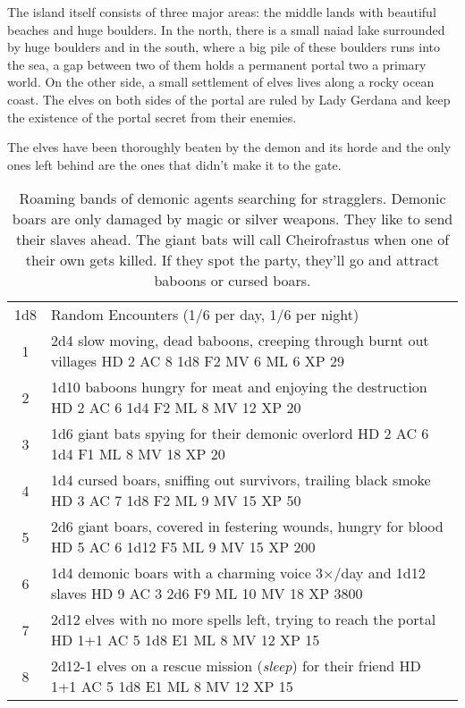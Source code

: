 \documentclass[a4paper,serif]{rpg-module}
\begin{document}
The island itself consists of three major areas: the middle lands with
beautiful beaches and huge boulders. In the north, there is a small
naiad lake surrounded by huge boulders and in the south, where a big
pile of these boulders runs into the sea, a gap between two of them
holds a permanent portal two a primary world. On the other side, a
small settlement of elves lives along a rocky ocean coast. The elves
on both sides of the portal are ruled by Lady Gerdana
and keep the existence of the portal secret from their enemies.

The elves have been thoroughly beaten by the demon and its horde and
the only ones left behind are the ones that didn't make it to the
gate.

\begin{table*}[b]
  \small
  \centering
  \begin{tabular}{cl}
    1d8 & Random Encounters (1/6 per day, 1/6 per night) \\
    \cmidrule(lr){1-1}\cmidrule(lr){2-2}
    1 & 2d4 slow moving, dead baboons, creeping through burnt out villages HD 2 AC 8 1d8 F2 MV 6 ML 6 XP 29 \\
    2 & 1d10 baboons hungry for meat and enjoying the destruction HD 2 AC 6 1d4 F2 ML 8 MV 12 XP 20 \\
    3 & 1d6 giant bats spying for their demonic overlord HD 2 AC 6 1d4 F1 ML 8 MV 18 XP 20 \\
    4 & 1d4 cursed boars, sniffing out survivors, trailing black smoke HD 3 AC 7 1d8 F2 ML 9 MV 15 XP 50 \\
    5 & 2d6 giant boars, covered in festering wounds, hungry for blood HD 5 AC 6 1d12 F5 ML 9 MV 15 XP 200 \\
    6 & 1d4 demonic boars with a charming voice 3×/day and 1d12 slaves HD 9 AC 3 2d6 F9 ML 10 MV 18 XP 3800 \\
    7 & 2d12 elves with no more spells left, trying to reach the portal HD 1+1 AC 5 1d8 E1 ML 8 MV 12 XP 15 \\
    8 & 2d12-1 elves on a rescue mission (\emph{sleep}) for their friend HD 1+1 AC 5 1d8 E1 ML 8 MV 12 XP 15 \\
  \end{tabular}
  \caption{Roaming bands of demonic agents searching for stragglers.
    Demonic boars are only damaged by magic or silver weapons. They
    like to send their slaves ahead. The giant bats will call
    Cheirofrastus when one of their own gets killed. If they spot the
    party, they'll go and attract baboons or cursed boars.}
\end{table*}
\end{document}
